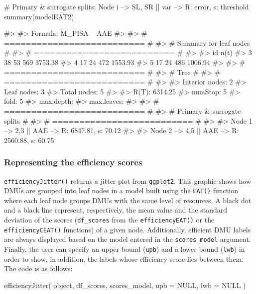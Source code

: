 \begin{Schunk}
\begin{Sinput}
# Primary & surrogate splits: Node i --> {SL, SR} || var --> {R: error, s: threshold}
summary(modelEAT2)
\end{Sinput}
\begin{Soutput}
#> 
#>   Formula:  M_PISA ~ AAE 
#> 
#>  # ========================== # 
#>  #   Summary for leaf nodes   # 
#>  # ========================== # 
#>  
#>  id n(t)  % M_PISA    R(t)
#>   3   38 53    569 3753.38
#>   4   17 24    472 1553.93
#>   5   17 24    486 1006.94
#> 
#>  # ========================== # 
#>  #            Tree            # 
#>  # ========================== # 
#>  
#>  Interior nodes: 2 
#>      Leaf nodes: 3 
#>     Total nodes: 5 
#>  
#>            R(T): 6314.25 
#>         numStop: 5 
#>            fold: 5 
#>       max.depth: 
#>      max.leaves:
#>  
#>  # ========================== # 
#>  # Primary & surrogate splits # 
#>  # ========================== # 
#>  
#>  Node 1 --> {2,3} || AAE --> {R: 6847.81, s: 70.12}
#> 
#>  Node 2 --> {4,5} || AAE --> {R: 2560.88, s: 60.75}
\end{Soutput}
\end{Schunk}

\hypertarget{representing-the-efficiency-scores}{%
\subsubsection{Representing the efficiency
scores}\label{representing-the-efficiency-scores}}

\texttt{efficiencyJitter()} returns a jitter plot from \texttt{ggplot2}.
This graphic shows how DMUs are grouped into leaf nodes in a model built
using the \texttt{EAT()} function where each leaf node groups DMUs with
the same level of resources. A black dot and a black line represent,
respectively, the mean value and the standard deviation of the scores
(\texttt{df\_scores} from the \texttt{efficiencyEAT()} or the
\texttt{efficiencyCEAT()} functions) of a given node. Additionally,
efficient DMU labels are always displayed based on the model entered in
the \texttt{scores\_model} argument. Finally, the user can specify an
upper bound (\texttt{upb}) and a lower bound (\texttt{lwb}) in order to
show, in addition, the labels whose efficiency score lies between them.
The code is as follows:

\begin{Schunk}
\begin{Sinput}
efficiencyJitter(
  object,
  df_scores,
  scores_model,
  upb = NULL,
  lwb = NULL
)
\end{Sinput}
\end{Schunk}

